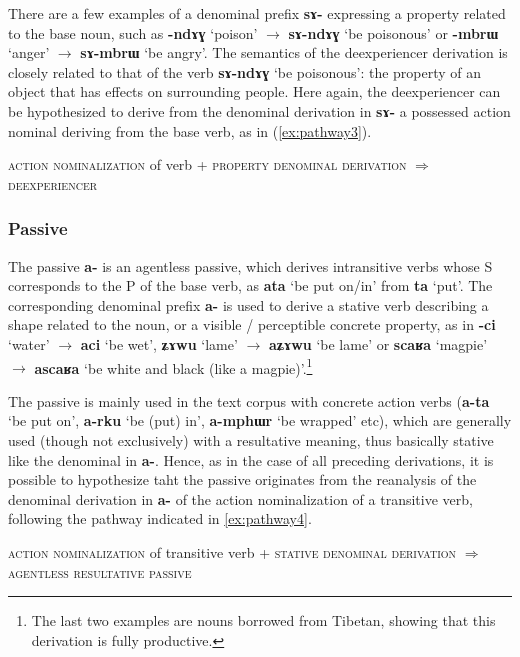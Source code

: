 \documentclass[oldfontcommands,oneside,a4paper,11pt]{article}
\newcommand{\ipa}[1]{\mbox{\phon\textbf{#1}}} %
\begin{document}
There are a few examples of a denominal prefix \ipa{sɤ-} expressing a property related to the base noun, such as \ipa{-ndɤɣ} `poison' $\rightarrow$ \ipa{sɤ-ndɤɣ} `be poisonous' or \ipa{-mbrɯ} `anger'  $\rightarrow$ \ipa{sɤ-mbrɯ} `be angry'. The semantics of the deexperiencer derivation is closely related to that of the verb  \ipa{sɤ-ndɤɣ} `be poisonous': the property of an object that has effects on surrounding people. Here again, the deexperiencer can be hypothesized to derive from the denominal derivation in \ipa{sɤ-} a possessed action nominal deriving from the base verb, as in (\ref{ex:pathway3}).

\begin{exe}
\ex \label{ex:pathway3}
\glt \textsc{action nominalization} of verb + \textsc{property denominal derivation} $\Rightarrow$ \textsc{deexperiencer}
\end{exe}
\subsubsection{Passive} \label{sec:passive}
The passive \ipa{a-} is an agentless passive, which derives intransitive verbs whose S corresponds to the P of the base verb, as \ipa{ata}  `be put on/in' from \ipa{ta} `put'. The corresponding denominal prefix \ipa{a-} is used to derive a stative verb describing a shape related to the noun, or a visible / perceptible concrete property, as in \ipa{-ci} `water' $\rightarrow$  \ipa{aci} `be wet',  \ipa{ʑɤwu} `lame' $\rightarrow$  \ipa{aʑɤwu} `be lame' 
or \ipa{scaʁa} `magpie' $\rightarrow$  \ipa{ascaʁa} `be white and black (like a magpie)'.\footnote{The last two examples are nouns borrowed from Tibetan, showing that this derivation is fully productive.} 

The passive is mainly used in the text corpus with concrete action verbs (\ipa{a-ta} `be put on', \ipa{a-rku} `be (put) in', \ipa{a-mphɯr} `be wrapped' etc),  which are generally used (though not exclusively) with a resultative meaning, thus basically stative like the denominal in \ipa{a-}. Hence, as in the case of all preceding derivations, it is possible to hypothesize taht the passive originates from the reanalysis of the denominal derivation in \ipa{a-} of  the action nominalization of a transitive verb, following the pathway indicated in \ref{ex:pathway4}.


\begin{exe}
\ex \label{ex:pathway4}
\glt \textsc{action nominalization} of transitive verb + \textsc{stative denominal derivation} $\Rightarrow$ \textsc{agentless resultative passive}
\end{exe}
\end{document}
